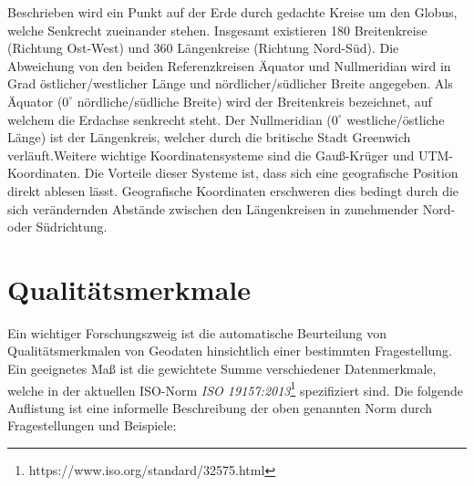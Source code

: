 \documentclass[11pt,fleqn]{book} %
\begin{document}
\noindent Beschrieben wird ein Punkt auf der Erde durch gedachte Kreise um den Globus, welche Senkrecht zueinander stehen. Insgesamt existieren 180 Breitenkreise (Richtung Ost-West) und 360 Längenkreise (Richtung Nord-Süd). Die Abweichung von den beiden Referenzkreisen Äquator und Nullmeridian wird in Grad östlicher/westlicher Länge und nördlicher/südlicher Breite angegeben. Als Äquator ($0^\circ$ nördliche/südliche Breite) wird der Breitenkreis bezeichnet, auf welchem die Erdachse senkrecht steht. Der Nullmeridian ($0^\circ$ westliche/östliche Länge) ist der Längenkreis, welcher durch die britische Stadt Greenwich verläuft.\newline Weitere wichtige Koordinatensysteme sind die Gauß-Krüger und UTM-Koordinaten. Die Vorteile dieser Systeme ist, dass sich eine geografische Position direkt ablesen lässt. Geografische Koordinaten erschweren dies bedingt durch die sich verändernden Abstände zwischen den Längenkreisen in zunehmender Nord- oder Südrichtung.


\section{Qualitätsmerkmale}
Ein wichtiger Forschungszweig ist die automatische Beurteilung von Qualitätsmerkmalen von Geodaten hinsichtlich einer bestimmten Fragestellung.
Ein geeignetes Maß ist die gewichtete Summe verschiedener Datenmerkmale, welche in der aktuellen ISO-Norm \textit{ISO 19157:2013}\footnote{https://www.iso.org/standard/32575.html} spezifiziert sind. Die folgende Auflistung ist eine informelle Beschreibung der oben genannten Norm durch Fragestellungen und Beispiele:
\end{document}
